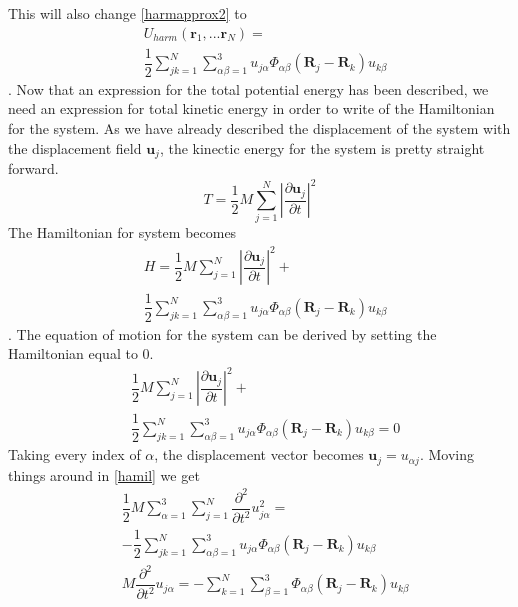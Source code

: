 \begin{equation}
\end{equation}This will also change \cref{harmapprox2} to\begin{align}
    &U_{harm}(\mathbf{r}_{1},...\mathbf{r}_{N})=\nonumber\\
    &\dfrac{1}{2}\sum_{jk=1}^{N}\sum_{\alpha\beta=1}^{3}u_{j\alpha}\Phi_{\alpha\beta}(\mathbf{R}_{j}-\mathbf{R}_{k})u_{k\beta}
\end{align}. Now that an expression for the total potential energy has been described, we need an expression for total kinetic energy in order to write of the Hamiltonian for the system. As we have already described the displacement of the system with the displacement field $\mathbf{u}_{j}$, the kinectic energy for the system is pretty straight forward.\begin{equation}
    T=\dfrac{1}{2}M\sum_{j=1}^{N}\left|\dfrac{\partial\mathbf{u}_{j}}{\partial t}\right|^{2}
\end{equation}The Hamiltonian for system becomes\begin{align}
    & H=\dfrac{1}{2}M\sum_{j=1}^{N}\left|\dfrac{\partial\mathbf{u}_{j}}{\partial t}\right|^{2}+\nonumber\\
    & \dfrac{1}{2}\sum_{jk=1}^{N}\sum_{\alpha\beta=1}^{3}u_{j\alpha}\Phi_{\alpha\beta}(\mathbf{R}_{j}-\mathbf{R}_{k})u_{k\beta}
\end{align}. The equation of motion for the system can be derived by setting the Hamiltonian equal to 0.\begin{align}
    & \dfrac{1}{2}M\sum_{j=1}^{N}\left|\dfrac{\partial\mathbf{u}_{j}}{\partial t}\right|^{2}+\nonumber\\
    & \dfrac{1}{2}\sum_{jk=1}^{N}\sum_{\alpha\beta=1}^{3}u_{j\alpha}\Phi_{\alpha\beta}(\mathbf{R}_{j}-\mathbf{R}_{k})u_{k\beta}=0\label{hamil}
\end{align} Taking every index of $\alpha$, the displacement vector becomes $\mathbf{u}_{j}=u_{\alpha j}$. Moving things around in \cref{hamil} we get\begin{align}
     & \dfrac{1}{2}M\sum_{\alpha=1}^{3}\sum_{j=1}^{N}\dfrac{\partial^{2}}{\partial t^{2}}u_{j\alpha}^{2}=\nonumber\\
    & -\dfrac{1}{2}\sum_{jk=1}^{N}\sum_{\alpha\beta=1}^{3}u_{j\alpha}\Phi_{\alpha\beta}(\mathbf{R}_{j}-\mathbf{R}_{k})u_{k\beta}\nonumber\\
    & M\dfrac{\partial^{2}}{\partial t^{2}}u_{j\alpha}=-\sum_{k=1}^{N}\sum_{\beta=1}^{3}\Phi_{\alpha\beta}(\mathbf{R}_{j}-\mathbf{R}_{k})u_{k\beta}\label{Eqmotion}

\end{align}
